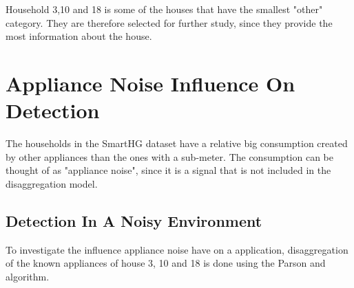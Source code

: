 Household 3,10 and 18 is some of the houses that have the smallest "other" category. They are therefore selected for further study, since they provide the most information about the house. 

\section{Appliance Noise Influence On Detection }
The households in the SmartHG dataset have a relative big consumption created by other appliances than the ones with a sub-meter. The consumption can be thought of as "appliance noise", since it is a signal that is not included in the disaggregation model. 

\subsection{Detection In A Noisy Environment }
To investigate the influence appliance noise have on a  application, disaggregation of the known appliances of house 3, 10 and 18 is done using the Parson and  algorithm. 

